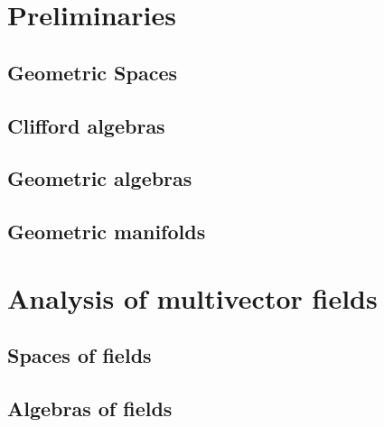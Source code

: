 \documentclass[doctor]{thesis}
\begin{document}

\chapter{Preliminaries}
\section{Geometric Spaces}
\label{subsec:quadratic_spaces}


\section{Clifford algebras}
\label{subsec:clifford_and_geometric_algebras}


\section{Geometric algebras}

\section{Geometric manifolds}
\label{sec:geometric_manifolds}




\chapter{Analysis of multivector fields}

\section{Spaces of fields}
\label{sec:spaces_of_fields}


\section{Algebras of fields}
\label{sec:algebras_of_fields}

\end{document}
